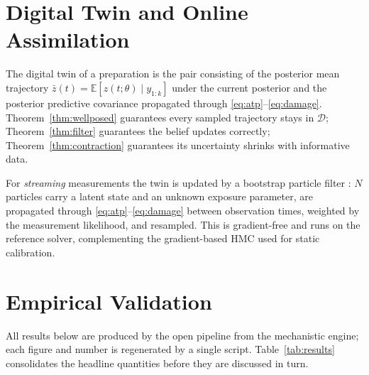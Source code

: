 \documentclass[journal]{IEEEtran}
\newcommand{\E}{\mathbb{E}}
\begin{document}
\section{Digital Twin and Online Assimilation}
\label{sec:twin}

The digital twin of a preparation is the pair consisting of the posterior mean
trajectory $\bar z(t)=\E[z(t;\theta)\mid y_{1:k}]$ under the current posterior and
the posterior predictive covariance propagated through
\eqref{eq:atp}--\eqref{eq:damage}. Theorem~\ref{thm:wellposed} guarantees every
sampled trajectory stays in $\mathcal{D}$; Theorem~\ref{thm:filter} guarantees the
belief updates correctly; Theorem~\ref{thm:contraction} guarantees its
uncertainty shrinks with informative data.

For \emph{streaming} measurements the twin is updated by a bootstrap particle
filter \cite{gordon1993,doucet2001}: $N$ particles carry a latent state and an
unknown exposure parameter, are propagated through \eqref{eq:atp}--\eqref{eq:damage}
between observation times, weighted by the measurement likelihood, and resampled.
This is gradient-free and runs on the reference solver, complementing the
gradient-based HMC used for static calibration.

\section{Empirical Validation}
\label{sec:results}

All results below are produced by the open pipeline from the mechanistic engine;
each figure and number is regenerated by a single script. Table~\ref{tab:results}
consolidates the headline quantities before they are discussed in turn.
\end{document}
